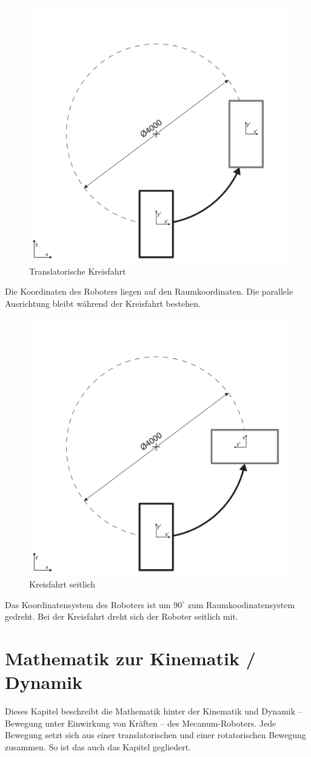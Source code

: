 \documentclass[a4paper]{article}
\begin{document}
\begin{figure}[H]
    \centering
    \includegraphics[width=.6\textwidth]{Viertelkreis-translatorisch}
    \caption{Translatorische Kreisfahrt}
\end{figure}
Die Koordinaten des Roboters liegen auf den Raumkoordinaten. Die parallele Ausrichtung bleibt während der Kreisfahrt bestehen.

\vspace{2cm}
\begin{figure}[H]
    \centering
    \includegraphics[width=.6\textwidth]{Viertelkreis-seitwaerts}
    \caption{Kreisfahrt seitlich}
\end{figure}
Das Koordinatensystem des Roboters ist um $90^\circ$ zum Raumkoodinatensystem gedreht. Bei der Kreisfahrt dreht sich der Roboter seitlich mit.


\section{Mathematik zur Kinematik / Dynamik}
Dieses Kapitel beschreibt die Mathematik hinter der Kinematik und Dynamik -- Bewegung unter Einwirkung von Kräften -- des Mecanum-Roboters. Jede Bewegung setzt sich aus einer translatorischen und einer rotatorischen Bewegung zusammen. So ist das auch das Kapitel gegliedert.
\end{document}
